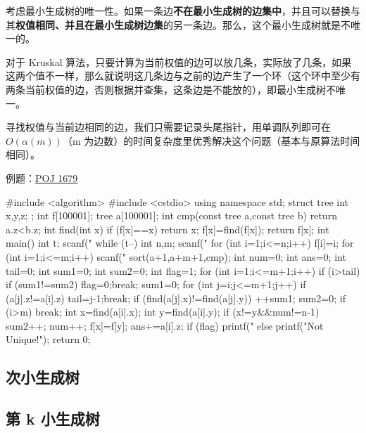 考虑最小生成树的唯一性。如果一条边\textbf{不在最小生成树的边集中}，并且可以替换与其\textbf{权值相同、并且在最小生成树边集}的另一条边。那么，这个最小生成树就是不唯一的。

对于 Kruskal 算法，只要计算为当前权值的边可以放几条，实际放了几条，如果这两个值不一样，那么就说明这几条边与之前的边产生了一个环（这个环中至少有两条当前权值的边，否则根据并查集，这条边是不能放的），即最小生成树不唯一。

寻找权值与当前边相同的边，我们只需要记录头尾指针，用单调队列即可在$O(\alpha(m))$（m 为边数）的时间复杂度里优秀解决这个问题（基本与原算法时间相同）。

\begin{NOTE}{例题：\href{http://poj.org/problem?id=1679}{POJ 1679}}{}

\begin{cppcode}
#include <algorithm>
#include <cstdio>
using namespace std;
struct tree
{
  int x,y,z;
};
int f[100001];
tree a[100001];
int cmp(const tree a,const tree b)
{
  return a.z<b.z;
}
int find(int x)
{
  if (f[x]==x) return x;
  f[x]=find(f[x]);
  return f[x];
}
int main()
{
  int t;
  scanf("%
  while (t--)
  {
    int n,m;
    scanf("%
    for (int i=1;i<=n;i++) f[i]=i;
    for (int i=1;i<=m;i++)
      scanf("%
    sort(a+1,a+m+1,cmp);
    int num=0;
    int ans=0;
    int tail=0;
    int sum1=0;
    int sum2=0;
    int flag=1;
    for (int i=1;i<=m+1;i++)
    {
      if (i>tail)
      {
        if (sum1!=sum2)
        {    
          flag=0;break;
        }
        sum1=0;
        for (int j=i;j<=m+1;j++)
        {
          if (a[j].z!=a[i].z) 
          {
            tail=j-1;break;
          }
          if (find(a[j].x)!=find(a[j].y)) ++sum1;
        }
        sum2=0;
      }
      if (i>m) break;
      int x=find(a[i].x);
      int y=find(a[i].y);
      if (x!=y&&num!=n-1)
      {
        sum2++;
        num++;
        f[x]=f[y];
        ans+=a[i].z;
      }
    }
    if (flag) printf("%
    else printf("Not Unique!\n");
  }
  return 0;
}
\end{cppcode}

\end{NOTE}


\subsection{次小生成树}

\subsection{第 k 小生成树}

